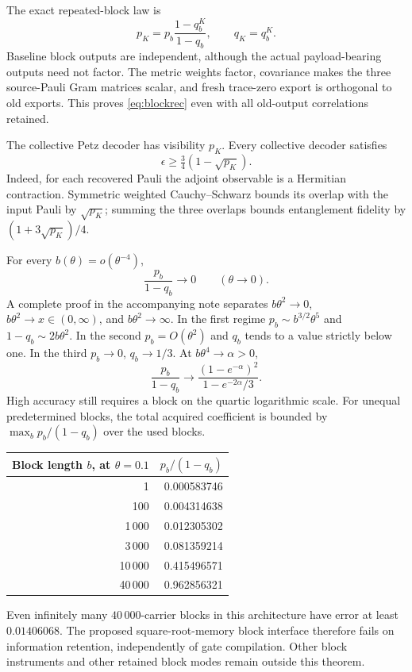 \documentclass[11pt]{article}
\begin{document}
The exact repeated-block law is
\begin{equation}
 p_K=p_b\frac{1-q_b^K}{1-q_b},\qquad q_K=q_b^K.
 \label{eq:blockrec}
\end{equation}
Baseline block outputs are independent, although the actual payload-bearing
outputs need not factor. The metric weights factor, covariance makes the
three source-Pauli Gram matrices scalar, and fresh trace-zero export is
orthogonal to old exports. This proves \eqref{eq:blockrec} even with all
old-output correlations retained.

The collective Petz decoder has visibility $p_K$. Every collective decoder
satisfies
\begin{equation}
 \epsilon\ge\tfrac34(1-\sqrt{p_K}).
 \label{eq:blocklower}
\end{equation}
Indeed, for each recovered Pauli the adjoint observable is a Hermitian
contraction. Symmetric weighted Cauchy--Schwarz bounds its overlap with the
input Pauli by $\sqrt{p_K}$; summing the three overlaps bounds entanglement
fidelity by $(1+3\sqrt{p_K})/4$.

For every $b(\theta)=o(\theta^{-4})$,
\begin{equation}
 \frac{p_b}{1-q_b}\longrightarrow0\qquad(\theta\to0).
 \label{eq:blocklimit}
\end{equation}
A complete proof in the accompanying note separates $b\theta^2\to0$,
$b\theta^2\to x\in(0,\infty)$, and $b\theta^2\to\infty$.
In the first regime $p_b\sim b^{3/2}\theta^5$ and
$1-q_b\sim2b\theta^2$. In the second $p_b=O(\theta^2)$ and $q_b$ tends
to a value strictly below one. In the third $p_b\to0$, $q_b\to1/3$.
At $b\theta^4\to\alpha>0$,
\[
 \frac{p_b}{1-q_b}\longrightarrow
 \frac{(1-e^{-\alpha})^2}{1-e^{-2\alpha}/3}.
\]
High accuracy still requires a block on the quartic logarithmic scale.
For unequal predetermined blocks, the total acquired coefficient is bounded
by $\max_b p_b/(1-q_b)$ over the used blocks.

\begin{center}
\begin{tabular}{r r}
\toprule
Block length $b$, at $\theta=0.1$ & $p_b/(1-q_b)$\\
\midrule
1 & 0.000583746\\
100 & 0.004314638\\
1\,000 & 0.012305302\\
3\,000 & 0.081359214\\
10\,000 & 0.415496571\\
40\,000 & 0.962856321\\
\bottomrule
\end{tabular}
\end{center}
Even infinitely many $40\,000$-carrier blocks in this architecture have
error at least $0.01406068$. The proposed square-root-memory block interface
therefore fails on information retention, independently of gate compilation.
Other block instruments and other retained block modes remain outside this
theorem.
\end{document}
